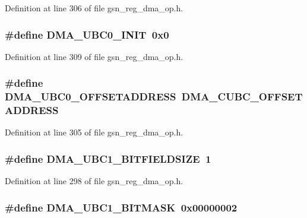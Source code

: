 Definition at line 306 of file gsn\_\-reg\_\-dma\_\-op.h.

\hypertarget{a00547_ad75ed5b05e9d95734b846b6aaab6abe5}{
\subsubsection[{DMA\_\-UBC0\_\-INIT}]{\setlength{\rightskip}{0pt plus 5cm}\#define DMA\_\-UBC0\_\-INIT~0x0}}
\label{a00547_ad75ed5b05e9d95734b846b6aaab6abe5}


Definition at line 309 of file gsn\_\-reg\_\-dma\_\-op.h.

\hypertarget{a00547_a379cfb51ce3d0e0869d99cc0707562a2}{
\subsubsection[{DMA\_\-UBC0\_\-OFFSETADDRESS}]{\setlength{\rightskip}{0pt plus 5cm}\#define DMA\_\-UBC0\_\-OFFSETADDRESS~DMA\_\-CUBC\_\-OFFSETADDRESS}}
\label{a00547_a379cfb51ce3d0e0869d99cc0707562a2}


Definition at line 305 of file gsn\_\-reg\_\-dma\_\-op.h.

\hypertarget{a00547_a081663bd259232b0190739875dc8f854}{
\subsubsection[{DMA\_\-UBC1\_\-BITFIELDSIZE}]{\setlength{\rightskip}{0pt plus 5cm}\#define DMA\_\-UBC1\_\-BITFIELDSIZE~1}}
\label{a00547_a081663bd259232b0190739875dc8f854}


Definition at line 298 of file gsn\_\-reg\_\-dma\_\-op.h.

\hypertarget{a00547_a8a03a43519b98675b8e2b8f74bdb7808}{
\subsubsection[{DMA\_\-UBC1\_\-BITMASK}]{\setlength{\rightskip}{0pt plus 5cm}\#define DMA\_\-UBC1\_\-BITMASK~0x00000002}}
\label{a00547_a8a03a43519b98675b8e2b8f74bdb7808}


